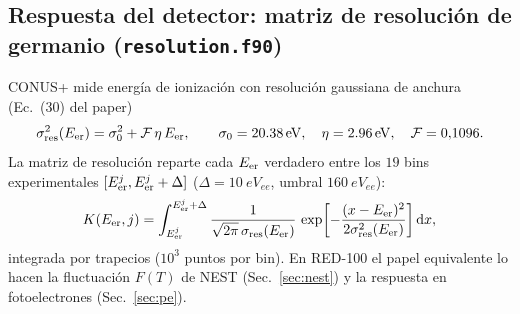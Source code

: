 \documentclass[11pt,a4paper]{article}
\newcommand{\Tnr}{T}
\newcommand{\Eer}{E_{\rm er}}
\newcommand{\code}[1]{\texttt{#1}}
\newcommand{\dd}{\mathrm{d}}
\begin{document}
\subsection{Respuesta del detector: matriz de resoluci\'on de germanio
(\code{resolution.f90})}
\label{sec:resol}

CONUS+ mide energ\'ia de ionizaci\'on con resoluci\'on gaussiana de anchura
(Ec.~(30) del paper)
\begin{equation}
  \label{eq:sigma_res}
  \sigma_{\rm res}^{2}(\Eer) = \sigma_{0}^{2} + \mathcal{F}\,\eta\,\Eer,
  \qquad
  \sigma_{0} = \SI{20.38}{eV},\quad \eta = \SI{2.96}{eV},\quad
  \mathcal{F} = 0{,}1096.
\end{equation}
La matriz de resoluci\'on reparte cada $\Eer$ verdadero entre los $19$ bins
experimentales $[\Eer^{j},\Eer^{j}+\Delta]$ ($\Delta=\SI{10}{eV_{ee}}$, umbral
$\SI{160}{eV_{ee}}$):
\begin{equation}
  \label{eq:Kmatrix}
  K(\Eer, j)
  = \int_{\Eer^{j}}^{\Eer^{j}+\Delta}
      \frac{1}{\sqrt{2\pi}\,\sigma_{\rm res}(\Eer)}\,
      \exp\!\left[-\frac{(x-\Eer)^{2}}{2\sigma_{\rm res}^{2}(\Eer)}\right] \dd x ,
\end{equation}
integrada por trapecios ($10^{3}$ puntos por bin). En RED-100 el papel
equivalente lo hacen la fluctuaci\'on $F(\Tnr)$ de NEST (Sec.~\ref{sec:nest}) y la
respuesta en fotoelectrones (Sec.~\ref{sec:pe}).
\end{document}
